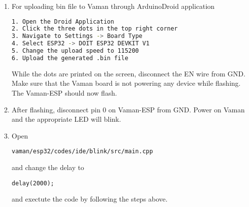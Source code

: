 \documentclass[12pt]{article}
\begin{document}
\begin{enumerate}[label=\thesection.\arabic*.,ref=\thesection.\theenumi]
\begin{lstlisting}
[env:esp32doit-devkit-v1]
platform = espressif32
board = esp32doit-devkit-v1
framework = arduino
platform_packages =                                                               toolchain-xtensa-esp32@https://github.com/esphome/esphome-docker-base/releases/download/v1.4.0/toolchain-xtensa32.tar.gz                             
framework-arduinoespressif32@<3.10006.210326
\end{lstlisting}
\item For uploading bin file to Vaman through ArduinoDroid application 
\begin{lstlisting}[language=bash]
1. Open the Droid Application
2. Click the three dots in the top right corner
3. Navigate to Settings -> Board Type
4. Select ESP32 -> DOIT ESP32 DEVKIT V1
5. Change the upload speed to 115200
6. Upload the generated .bin file
\end{lstlisting}
While the dots are printed on the screen, disconnect the EN wire from GND.   Make sure that the Vaman board is not powering any device while flashing.  The Vaman-ESP should now flash.
\iffalse
\item Execute the following
\begin{lstlisting}
cd vaman/esp32/codes/ide/blink
pio run 
pio run -t nobuild -t upload
\end{lstlisting}
While the dots and dashes are printed on the screen, disconnect the EN wire from GND.   Make sure that the Vaman board is not powering any device while flashing.  The Vaman-ESP should now flash.
\fi
\item After flashing, disconnect pin 0 on Vaman-ESP from GND. Power on Vaman and the appropriate LED will blink.
\item Open
\begin{lstlisting}
vaman/esp32/codes/ide/blink/src/main.cpp 
\end{lstlisting}
and change the delay to 
\begin{lstlisting}
delay(2000);
\end{lstlisting}
and exectute the code by following the steps above.
\end{enumerate}
\end{document}
